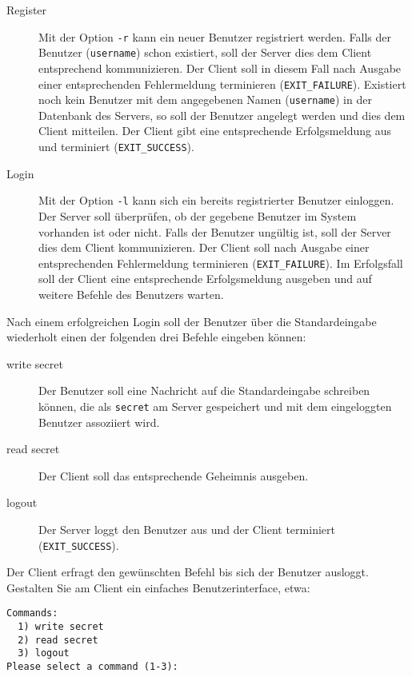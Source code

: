 \begin{description}
  \item[Register] Mit der Option \texttt{-r} kann ein neuer Benutzer
    registriert werden. Falls der Benutzer (\texttt{username}) schon existiert,
    soll der Server dies dem Client entsprechend kommunizieren. Der Client soll
    in diesem Fall nach Ausgabe einer entsprechenden Fehlermeldung terminieren
    (\texttt{EXIT\_FAILURE}).  Existiert noch kein Benutzer mit dem angegebenen
    Namen (\texttt{username}) in der Datenbank des Servers, so soll der
    Benutzer angelegt werden und dies dem Client mitteilen. Der Client gibt
    eine entsprechende Erfolgsmeldung aus und terminiert
    (\texttt{EXIT\_SUCCESS}).
  \item[Login] Mit der Option \texttt{-l} kann sich ein
    bereits registrierter Benutzer einloggen. Der Server soll überprüfen, ob
    der gegebene Benutzer im System vorhanden ist oder nicht. Falls der
    Benutzer ungültig ist, soll der Server dies dem Client kommunizieren. Der
    Client soll nach Ausgabe einer entsprechenden Fehlermeldung terminieren
    (\texttt{EXIT\_FAILURE}).  Im Erfolgsfall soll der Client eine
    entsprechende Erfolgsmeldung ausgeben und auf weitere Befehle des Benutzers
    warten.
\end{description}

Nach einem erfolgreichen Login soll der Benutzer über die Standardeingabe
wiederholt einen der folgenden drei Befehle eingeben können:

\begin{description}
  \item[write secret] Der Benutzer soll eine Nachricht auf die Standardeingabe
    schreiben können, die als \texttt{secret} am Server gespeichert und mit dem
    eingeloggten Benutzer assoziiert wird.
  \item[read secret] Der Client soll das entsprechende Geheimnis
    ausgeben.
  \item[logout] Der Server loggt den Benutzer aus und der Client terminiert
    (\texttt{EXIT\_SUCCESS}).
\end{description}

Der Client erfragt den gewünschten Befehl bis sich der Benutzer ausloggt.
Gestalten Sie am Client ein einfaches Benutzerinterface, etwa:
\begin{verbatim}
Commands:
  1) write secret
  2) read secret
  3) logout
Please select a command (1-3):
\end{verbatim}


